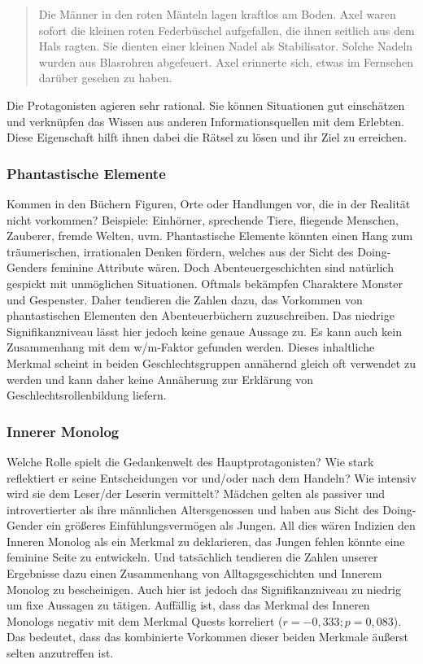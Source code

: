 \begin{quote}
Die Männer in den roten Mänteln lagen kraftlos am Boden. \textelp{} Axel
waren sofort die kleinen roten Federbüschel aufgefallen, die ihnen
seitlich aus dem Hals ragten. Sie dienten einer kleinen Nadel als
Stabilisator. Solche Nadeln wurden aus Blasrohren abgefeuert. Axel
erinnerte sich, etwas im Fernsehen darüber gesehen zu haben.
\parencite[][117]{Brezina2010}
\end{quote}

Die Protagonisten agieren sehr rational. Sie können Situationen gut
einschätzen und verknüpfen das Wissen aus anderen Informationsquellen
mit dem Erlebten. Diese Eigenschaft hilft ihnen dabei die Rätsel zu
lösen und ihr Ziel zu erreichen.

\subsubsection{Phantastische Elemente}

Kommen in den Büchern Figuren, Orte oder Handlungen vor, die in der
Realität nicht vorkommen? Beispiele: Einhörner, sprechende Tiere,
fliegende Menschen, Zauberer, fremde Welten, uvm. Phantastische Elemente
könnten einen Hang zum träumerischen, irrationalen Denken fördern,
welches aus der Sicht des Doing-Genders feminine Attribute wären. Doch
Abenteuergeschichten sind natürlich gespickt mit unmöglichen
Situationen. Oftmals bekämpfen Charaktere Monster und Gespenster. Daher
tendieren die Zahlen dazu, das Vorkommen von phantastischen Elementen
den Abenteuerbüchern zuzuschreiben. Das niedrige Signifikanzniveau lässt
hier jedoch keine genaue Aussage zu. Es kann auch kein Zusammenhang mit
dem w/m-Faktor gefunden werden. Dieses inhaltliche Merkmal scheint in
beiden Geschlechtsgruppen annähernd gleich oft verwendet zu werden und
kann daher keine Annäherung zur Erklärung von Geschlechtsrollenbildung
liefern.

\subsubsection{Innerer Monolog}

Welche Rolle spielt die Gedankenwelt des Hauptprotagonisten? Wie stark
reflektiert er seine Entscheidungen vor und/oder nach dem Handeln? Wie
intensiv wird sie dem Leser/der Leserin vermittelt? Mädchen gelten als
passiver und introvertierter als ihre männlichen Altersgenossen und
haben aus Sicht des Doing-Gender ein größeres Einfühlungsvermögen als
Jungen. All dies wären Indizien den Inneren Monolog als ein Merkmal zu
deklarieren, das Jungen fehlen könnte eine feminine Seite zu entwickeln.
Und tatsächlich tendieren die Zahlen unserer Ergebnisse dazu einen
Zusammenhang von Alltagsgeschichten und Innerem Monolog zu bescheinigen.
Auch hier ist jedoch das Signifikanzniveau zu niedrig um fixe Aussagen
zu tätigen. Auffällig ist, dass das Merkmal des Inneren Monologs negativ
mit dem Merkmal Quests korreliert ($r= -0{,}333; p=0{,}083$). Das
bedeutet, dass das kombinierte Vorkommen dieser beiden Merkmale äußerst
selten anzutreffen ist.

